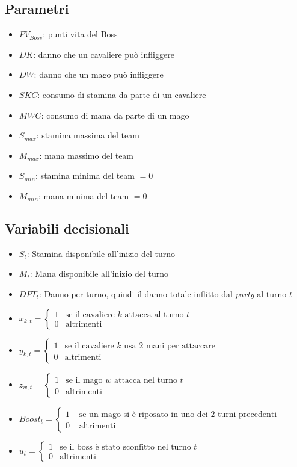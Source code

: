 \documentclass[12pt]{article}
\begin{document}
    \subsection{Parametri}
    \begin{itemize}
        \item $PV_{Boss}$: punti vita del Boss
        \item $DK$: danno che un cavaliere può infliggere
        \item $DW$: danno che un mago può infliggere
        \item $SKC$: consumo di stamina da parte di un cavaliere
        \item $MWC$: consumo di mana da parte di un mago
        \item $S_{max}$: stamina massima del team
        \item $M_{max}$: mana massimo del team
        \item $S_{min}$: stamina minima del team $=0$
        \item $M_{min}$: mana minima del team $=0$
    \end{itemize}
   \subsection{Variabili decisionali}
   \begin{itemize}
    \item $S_t$: Stamina disponibile all'inizio del turno
    \item $M_t$: Mana disponibile all'inizio del turno
    \item $DPT_t$: Danno per turno, quindi il danno totale inflitto dal \textit{party} al turno $t$
    \item $x_{k,t} = \begin{cases} 
        1 & \text{se il cavaliere } k \text{ attacca al turno } t \\ 
        0 & \text{altrimenti} 
    \end{cases}$
    \item $y_{k,t} = \begin{cases} 
        1 & \text{se il cavaliere } k \text{ usa 2 mani per attaccare } \\ 
        0 & \text{altrimenti} 
    \end{cases}$
    \item $z_{w,t} = \begin{cases} 
        1 & \text{se il mago } w \text{ attacca nel turno } t \\ 
        0 & \text{altrimenti} 
    \end{cases}$
    \item $Boost_t = \begin{cases}
        1 & \text{ se } \text{un mago si è riposato in uno dei 2 turni precedenti } \\
        0 & \text{ altrimenti }
    \end{cases}$
    \item $u_t = \begin{cases}
        1 & \text{se il boss è stato sconfitto nel turno } t \\
        0 & \text{altrimenti}
    \end{cases}$
    \end{itemize}
\end{document}
